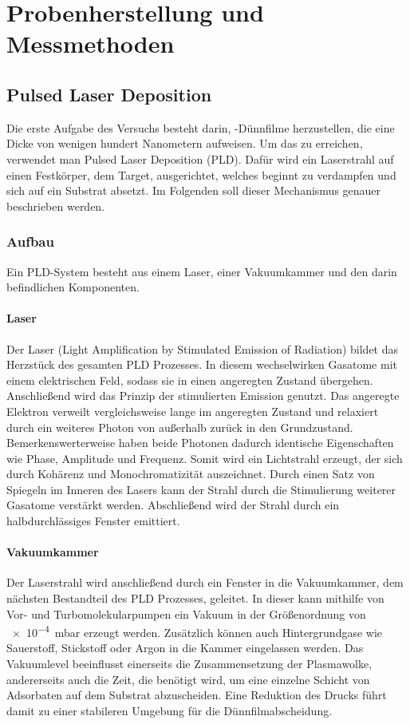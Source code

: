 \section{Probenherstellung und Messmethoden}\label{sec:messmethoden}
\subsection{Pulsed Laser Deposition}\label{subsec:pld}
Die erste Aufgabe des Versuchs besteht darin, \heo-Dünnfilme herzustellen, die eine Dicke von wenigen hundert
Nanometern aufweisen.
Um das zu erreichen, verwendet man Pulsed Laser Deposition (PLD).
Dafür wird ein Laserstrahl auf einen Festkörper, dem Target, ausgerichtet, welches beginnt zu
verdampfen und sich auf ein Substrat absetzt.
Im Folgenden soll dieser Mechanismus genauer beschrieben werden.

\subsubsection{Aufbau}
Ein PLD-System besteht aus einem Laser, einer Vakuumkammer und den darin befindlichen Komponenten.
\paragraph{Laser}
Der Laser (Light Amplification by Stimulated Emission of Radiation) bildet das Herzstück des gesamten PLD Prozesses.
In diesem wechselwirken Gasatome mit einem elektrischen Feld, sodass sie in einen angeregten Zustand übergehen.
Anschließend wird das Prinzip der stimulierten Emission genutzt.
Das angeregte Elektron verweilt vergleichsweise lange im angeregten Zustand und relaxiert durch ein
weiteres Photon von außerhalb zurück in den Grundzustand.
Bemerkenswerterweise haben beide Photonen dadurch identische Eigenschaften wie Phase, Amplitude und Frequenz.
Somit wird ein Lichtstrahl erzeugt, der sich durch Kohärenz und Monochromatizität auszeichnet.
Durch einen Satz von Spiegeln im Inneren des Lasers kann der Strahl durch die Stimulierung weiterer Gasatome
verstärkt werden.
Abschließend wird der Strahl durch ein halbdurchlässiges Fenster emittiert. \autocite[2296-2297]{pld}
\paragraph{Vakuumkammer}
Der Laserstrahl wird anschließend durch ein Fenster in die Vakuumkammer, dem nächsten Bestandteil des PLD Prozesses,
geleitet.
In dieser kann mithilfe von Vor- und Turbomolekularpumpen ein Vakuum in der Größenordnung von
\qty{e-4}{\milli\bar} erzeugt werden.
Zusätzlich können auch Hintergrundgase wie Sauerstoff, Stickstoff oder Argon in die Kammer eingelassen werden.
Das Vakuumlevel beeinflusst einerseits die Zusammensetzung der Plasmawolke, andererseits auch die
Zeit, die benötigt wird, um eine einzelne Schicht von Adsorbaten auf dem Substrat abzuscheiden.
Eine Reduktion des Drucks führt damit zu einer stabileren Umgebung für die Dünnfilmabscheidung.\autocite[2297-2298]{pld}
